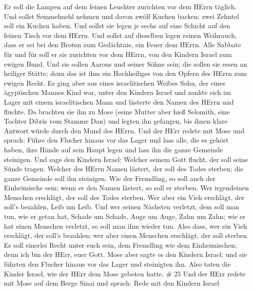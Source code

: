  Er soll die Lampen auf dem feinen Leuchter zurichten vor
dem HErrn täglich.  Und sollst Semmelmehl nehmen und davon
zwölf Kuchen backen; zwei Zehntel soll ein Kuchen haben. 
Und sollst sie legen je sechs auf eine Schicht auf den feinen Tisch vor
dem HErrn.  Und sollst auf dieselben legen reinen Weihrauch,
dass er sei bei den Broten zum Gedächtnis, ein Feuer dem HErrn.
 Alle Sabbate für und für soll er sie zurichten vor dem
HErrn, von den Kindern Israel zum ewigen Bund.  Und sie
sollen Aarons und seiner Söhne sein; die sollen sie essen an heiliger
Stätte; denn das ist ihm ein Hochheiliges von den Opfern des HErrn zum
ewigen Recht.  Es ging aber aus eines israelitischen Weibes
Sohn, der eines ägyptischen Mannes Kind war, unter den Kindern Israel
und zankte sich im Lager mit einem israelitischen Mann  und
lästerte den Namen des HErrn und fluchte. Da brachten sie ihn zu Mose
(seine Mutter aber hieß Selomith, eine Tochter Dibris vom Stamme Dan)
 und legten ihn gefangen, bis ihnen klare Antwort würde
durch den Mund des HErrn.  Und der HErr redete mit Mose und
sprach:  Führe den Flucher hinaus vor das Lager und lass
alle, die es gehört haben, ihre Hände auf sein Haupt legen und lass ihn
die ganze Gemeinde steinigen.  Und sage den Kindern Israel:
Welcher seinem Gott flucht, der soll seine Sünde tragen. 
Welcher des HErrn Namen lästert, der soll des Todes sterben; die ganze
Gemeinde soll ihn steinigen. Wie der Fremdling, so soll auch der
Einheimische sein; wenn er den Namen lästert, so soll er sterben.
 Wer irgendeinen Menschen erschlägt, der soll des Todes
sterben.  Wer aber ein Vieh erschlägt, der soll's bezahlen,
Leib um Leib.  Und wer seinen Nächsten verletzt, dem soll
man tun, wie er getan hat,  Schade um Schade, Auge um Auge,
Zahn um Zahn; wie er hat einen Menschen verletzt, so soll man ihm wieder
tun.  Also dass, wer ein Vieh erschlägt, der soll's
bezahlen; wer aber einen Menschen erschlägt, der soll sterben.
 Es soll einerlei Recht unter euch sein, dem Fremdling wie
dem Einheimischen; denn ich bin der HErr, euer Gott.  Mose
aber sagte es den Kindern Israel; und sie führten den Flucher hinaus vor
das Lager und steinigten ihn. Also taten die Kinder Israel, wie der HErr
dem Mose geboten hatte. \# 25  Und der HErr redete mit Mose
auf dem Berge Sinai und sprach:  Rede mit den Kindern Israel
